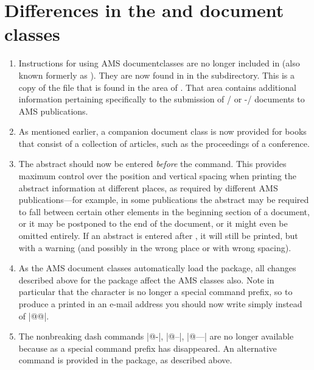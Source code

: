 \documentclass{amsdtx}
\begin{document}
\section{Differences in the  and  document
classes}

\begin{enumerate}

\item Instructions for using AMS documentclasses are no longer included
in  (also known formerly as ). They are
now found in  in the  subdirectory. This is
a copy of the file  that is found in the
 area of . That area contains
additional information pertaining specifically to the submission of
\latex/ or \AmS-\tex/ documents to AMS publications.

\item As mentioned earlier, a companion document class  is
now provided for books that consist of a collection of articles, such as
the proceedings of a conference.

\item The abstract should now be entered \emph{before} the
 command. This provides maximum control over the position
and vertical spacing when printing the abstract information at different
places, as required by different AMS publications---for example, in some
publications the abstract may be required to fall between certain other
elements in the beginning section of a document, or it may be postponed
to the end of the document, or it might even be omitted entirely. If an
abstract is entered after , it will still be printed, but
with a warning (and possibly in the wrong place or with wrong spacing).

\item As the AMS document classes automatically load the 
package, all changes described above for the  package
affect the AMS classes also. Note in particular that the \qc{\@}
character is no longer a special command prefix, so to produce a printed
\qc{\@} in an e-mail address you should now write simply \qc{\@} instead
of |@@|.

\item The nonbreaking dash commands |@-|, |@--|, |@---| are no longer
available because \qc{\@} as a special command prefix has disappeared.
An alternative  command is provided in the 
package, as described above.


\end{enumerate}
\end{document}
